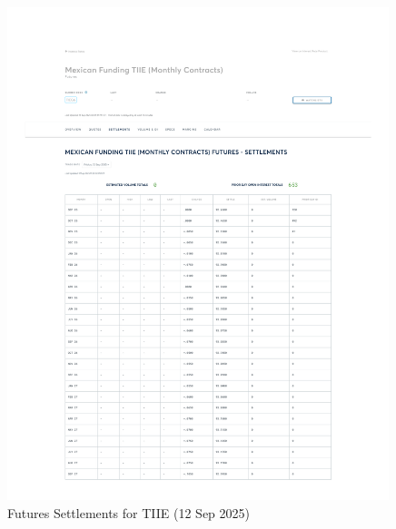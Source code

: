 \documentclass[11pt,a4paper]{article} %
\begin{document}
\begin{figure}[h]
  \centering
  \includegraphics[width=0.99\textwidth]{appendix/TIIE12SEP.pdf}
  \caption{Futures Settlements for TIIE (12 Sep 2025)}
  \label{fig:tiie_settlements}
\end{figure}
\end{document}
